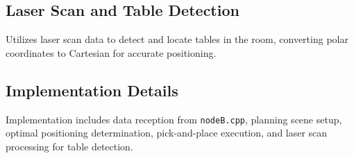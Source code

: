 \documentclass[a4paper]{article}
\begin{document}
\subsection{Laser Scan and Table Detection}

Utilizes laser scan data to detect and locate tables in the room, converting polar coordinates to Cartesian for accurate positioning.

\subsection{Implementation Details}

Implementation includes data reception from \texttt{nodeB.cpp}, planning scene setup, optimal positioning determination, pick-and-place execution, and laser scan processing for table detection.
\end{document}
